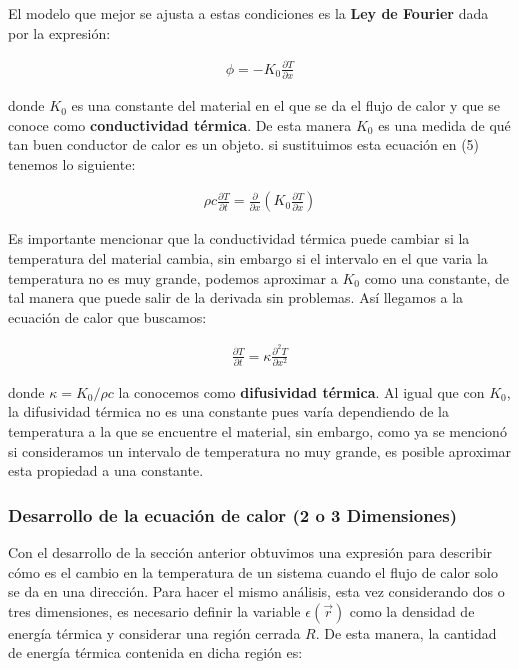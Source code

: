 \documentclass[12pt]{article}
\begin{document}
El modelo que mejor se ajusta a estas condiciones es la \textbf{Ley de Fourier} dada por la expresión:

\begin{align}
    \phi = -K_0\frac{\partial T}{\partial x}
\end{align}

donde $K_0$ es una constante del material en el que se da el flujo de calor y que se conoce como \textbf{conductividad térmica}. De esta manera $K_0$ es una medida de qué tan buen conductor de calor es un objeto. si sustituimos esta ecuación en (5) tenemos lo siguiente:

\begin{align*}
    \rho c\frac{\partial T}{\partial t} = \frac{\partial }{\partial x}\left( K_0\frac{\partial T}{\partial x} \right)
\end{align*}

Es importante mencionar que la conductividad térmica puede cambiar si la temperatura del material cambia, sin embargo si el intervalo en el que varia la temperatura no es muy grande, podemos aproximar a $K_0$ como una constante, de tal manera que puede salir de la derivada sin problemas. Así llegamos a la ecuación de calor que buscamos:

\begin{align}
    \frac{\partial T}{\partial t} = \kappa\frac{\partial^2 T}{\partial x^2}
\end{align}

donde $\kappa = K_0/\rho c$ la conocemos como \textbf{difusividad térmica}. Al igual que con $K_0$, la difusividad térmica no es una constante pues varía dependiendo de la temperatura a la que se encuentre el material, sin embargo, como ya se mencionó si consideramos un intervalo de temperatura no muy grande, es posible aproximar esta propiedad a una constante. \\

\subsubsection{Desarrollo de la ecuación de calor (2 o 3 Dimensiones)}

Con el desarrollo de la sección anterior obtuvimos una expresión para describir cómo es el cambio en la temperatura de un sistema cuando el flujo de calor solo se da en una dirección. Para hacer el mismo análisis, esta vez considerando dos o tres dimensiones, es necesario definir la variable $\epsilon (\vec{r})$ como la densidad de energía térmica y considerar una región cerrada $R$. De esta manera, la cantidad de energía térmica contenida en dicha región es:
\end{document}
